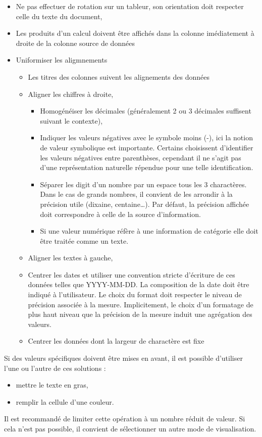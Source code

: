\documentclass[11pt]{article}
\begin{document}
\begin{itemize}
\begin{itemize}
\end{itemize}
\item Ne pas effectuer de rotation sur un tableur, son orientation doit respecter celle du texte du document,
\item Les produits d'un calcul doivent être affichés dans la colonne imédiatement à droite de la colonne source de données
\item Uniformiser les aligmnements
\begin{itemize}
\item Les titres des colonnes suivent les alignements des données
\item Aligner les chiffres à droite,
\begin{itemize}
\item Homogénéiser les décimales (généralement 2 ou 3 décimales suffisent suivant le contexte),
\item Indiquer les valeurs négatives avec le symbole \og moins\fg{} (-), ici la notion de valeur symbolique est importante. Certains choisissent d'identifier les valeurs négatives entre parenthèses, cependant il ne s'agit pas d'une représentation naturelle répendue pour une telle identification.
\item Séparer les digit d'un nombre par un espace tous les 3 charactères. Dans le cas de grands nombres, il convient de les arrondir à la précision utile (dixaine, centaine\ldots{}). Par défaut, la précision affichée doit correspondre à celle de la source d'information.
\item Si une valeur numérique réfère à une information de catégorie elle doit être traitée comme un texte.
\end{itemize}
\item Aligner les textes à gauche,
\item Centrer les dates et utiliser une convention stricte d'écriture de ces données telles que \og YYYY-MM-DD\fg{}.\autocite[8601]{ISO} La composition de la date doit être indiqué à l'utilisateur. Le choix du format doit respecter le niveau de précision associée à la mesure. Implicitement, le choix d'un formatage de plus haut niveau que la précision de la mesure induit une agrégation des valeurs.
\item Centrer les données dont la largeur de charactère est fixe
\end{itemize}
\end{itemize}

Si des valeurs spécifiques doivent être mises en avant, il est possible d'utiliser l'une ou l'autre de ces solutions :
\begin{itemize}
\item mettre le texte en gras,
\item remplir la cellule d'une couleur.
\end{itemize}
Il est recommandé de limiter cette opération à un nombre réduit de valeur. Si cela n'est pas possible, il convient de sélectionner un autre mode de visualisation.
\end{document}
